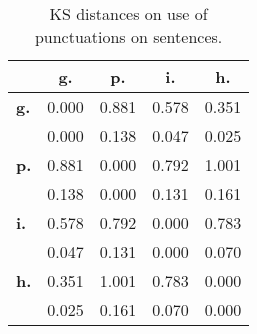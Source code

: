 \begin{table}[h!]
\begin{center}
\begin{tabular}{| l || c | c | c | c |}\hline
 & {\bf g.} & {\bf p.} & {\bf i.} & {\bf h.} \\\hline\hline
{\bf g.} & 0.000 & 0.881 & 0.578 & 0.351 \\
{\bf } & 0.000 & 0.138 & 0.047 & 0.025 \\\hline
{\bf p.} & 0.881 & 0.000 & 0.792 & 1.001 \\
{\bf } & 0.138 & 0.000 & 0.131 & 0.161 \\\hline
{\bf i.} & 0.578 & 0.792 & 0.000 & 0.783 \\
{\bf } & 0.047 & 0.131 & 0.000 & 0.070 \\\hline
{\bf h.} & 0.351 & 1.001 & 0.783 & 0.000 \\
{\bf } & 0.025 & 0.161 & 0.070 & 0.000 \\\hline
\end{tabular}
\caption{KS distances on use of punctuations on sentences.}
\end{center}
\end{table}